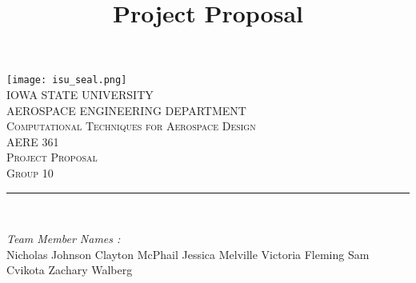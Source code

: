 \documentclass[12pt]{article}
\begin{document}
\title{Project Proposal}

\begin{titlepage}
	\centering
    \vspace*{0.5 cm}
    \texttt{[image: isu\_seal.png]}\\[1.0 cm]	%
    \textsc{\LARGE IOWA STATE UNIVERSITY}\\[2.0 cm]
    \textsc{\large AEROSPACE ENGINEERING DEPARTMENT}\\[0.2 cm]
    \textsc{\large Computational Techniques for Aerospace Design}\\[0.2 cm]
	\textsc{\Large AERE 361}\\[0.5 cm]				%
	\textsc{\Large Project Proposal}\\[0.2 cm]
	\textsc{\Large Group 10}\\[0.2 cm]
	\rule{\linewidth}{0.2 mm} \\[0.4 cm]
	
	
	\begin{minipage}{0.8\textwidth}
		
			\begin{flushleft} 
			\emph{Team Member Names :} \\
			Nicholas Johnson\linebreak
			Clayton McPhail\linebreak
			Jessica Melville\linebreak
			Victoria Fleming\linebreak
			Sam Cvikota\linebreak
			Zachary Walberg\linebreak
			
		\end{flushleft}
	\end{minipage}\\[2 cm]
	
	\vfill
	
\end{titlepage}

\tableofcontents
\pagebreak
\end{document}
